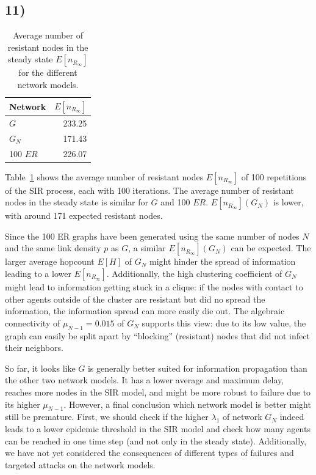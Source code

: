 \documentclass{article}
\begin{document}
\subsection*{11)}


\begin{table}[H]
  \centering
  \begin{tabular}{lr}
    \toprule
    Network    & $E[n_{R_\infty}]$ \\
    \midrule
    $G$      & 233.25            \\
    $G_N$    & 171.43            \\
    100 $ER$ & 226.07            \\
    \bottomrule
  \end{tabular}
  \caption{Average number of resistant nodes in
    the steady state $E[n_{R_\infty}]$ for the different network models.}
  \label{tab:steady}
\end{table}

Table~\ref{tab:steady} shows the average number of resistant nodes
$E[n_{R_\infty}]$ of 100 repetitions of the SIR process, each with 100
iterations. The average number of resistant nodes in the steady state
is similar for $G$ and 100 $ER$. $E[n_{R_\infty}](G_N)$ is lower, with
around 171 expected resistant nodes.

Since the 100 ER graphs have been generated using the same number of
nodes $N$ and the same link density $p$ as $G$, a similar
$E[n_{R_\infty}](G_N)$ can be expected. The larger average hopcount
$E[H]$ of $G_N$ might hinder the spread of information leading to a
lower $E[n_{R_\infty}]$. Additionally, the high clustering coefficient
of $G_N$ might lead to information getting stuck in a clique: if the
nodes with contact to other agents outside of the cluster are
resistant but did no spread the information, the information spread
can more easily die out. The algebraic connectivity of $\mu_{N-1} =
0.015$ of $G_N$ supports this view: due to its low value, the graph
can easily be split apart by ``blocking'' (resistant) nodes that did
not infect their neighbors.
 
So far, it looks like $G$ is generally better suited for information
propagation than the other two network models. It has a lower average
and maximum delay, reaches more nodes in the SIR model, and might be
more robust to failure due to its higher $\mu_{N-1}$.  However, a
final conclusion which network model is better might still be
premature. First, we should check if the higher $\lambda_1$ of network
$G_N$ indeed leads to a lower epidemic threshold in the SIR model and
check how many agents can be reached in one time step (and not only in
the steady state). Additionally, we have not yet considered the
consequences of different types of failures and targeted attacks on
the network models.
\end{document}
